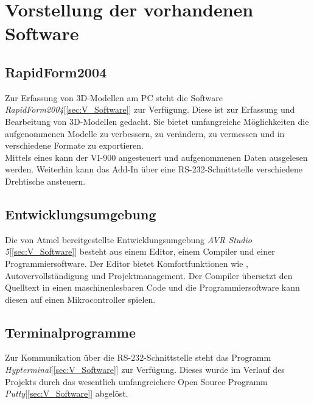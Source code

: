 \chapter{Vorstellung der vorhandenen Software}
\label{cha:Software}

\section{RapidForm2004}
\label{sec:RapidForm}
Zur Erfassung von 3D-Modellen am PC steht die Software \emph{RapidForm2004}[\ref{sec:V_Software}] zur Verfügung. Diese ist zur Erfassung und Bearbeitung von 3D-Modellen gedacht. Sie bietet umfangreiche Möglichkeiten die aufgenommenen Modelle zu verbessern, zu verändern, zu vermessen und in verschiedene Formate zu exportieren.\\
Mittels eines  kann der VI-900 angesteuert und aufgenommenen Daten ausgelesen werden. Weiterhin kann das Add-In über eine RS-232-Schnittstelle verschiedene Drehtische ansteuern.

\section{Entwicklungsumgebung}
\label{sec:Entwicklungsumgebung}
Die von Atmel bereitgestellte Entwicklungsumgebung \emph{AVR Studio 5}[\ref{sec:V_Software}] besteht aus einem Editor, einem Compiler und einer Programmiersoftware. Der Editor bietet Komfortfunktionen wie , Autovervollständigung und Projektmanagement. Der Compiler übersetzt den Quelltext in einen maschinenlesbaren Code und die Programmiersoftware kann diesen auf einen Mikrocontroller spielen.

\section{Terminalprogramme}
\label{sec:Terminal}
Zur Kommunikation über die RS-232-Schnittstelle steht das Programm \emph{Hypterminal}[\ref{sec:V_Software}] zur Verfügung. Dieses wurde im Verlauf des Projekts durch das wesentlich umfangreichere Open Source Programm \emph{Putty}[\ref{sec:V_Software}] abgelöst.